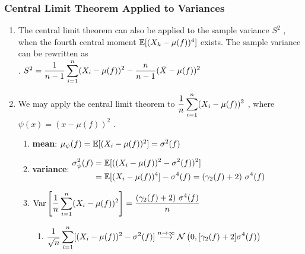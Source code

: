 \subsubsection{Central Limit Theorem Applied to Variances}

\begin{enumerate}
    \item The central limit theorem can also be applied to the sample variance $S^2$ , when the fourth central moment $\mathbb{E}[(X _k - \mu( f ))^4]$ exists.
    The sample variance can be rewritten as
    \hfill \cite{statistics/book/Statistics-for-Data-Scientists/Maurits-Kaptein}
    \\
    .\hfill
    $
        S^2 = \dfrac{1}{n - 1} \displaystyle\sum^n _{i=1} (X _i - \mu( f ))^2 - \dfrac{n}{n - 1} (\bar{X} - \mu( f ))^2
    $
    \hfill \cite{statistics/book/Statistics-for-Data-Scientists/Maurits-Kaptein}

    \item We may apply the central limit theorem to $\dfrac{1}{ n} \displaystyle\sum ^n _{i=1} (X_ i - \mu  ( f ))^2$ , where $\psi(x) = (x - \mu ( f ))^2$ .
    \hfill \cite{statistics/book/Statistics-for-Data-Scientists/Maurits-Kaptein}
    \begin{enumerate}
        \item \textbf{mean}: $\mu _\psi ( f ) = \mathbb{E}[(X _i - \mu ( f ))^2] = \sigma ^2( f )$
        \hfill \cite{statistics/book/Statistics-for-Data-Scientists/Maurits-Kaptein}

        \item \textbf{variance}:
        $
            \begin{aligned}
                \sigma  ^2 _\psi ( f )
                &= \mathbb{E}[((X _i - \mu ( f ))^2 - \sigma ^ 2( f ))^2 ] \\
                &= \mathbb{E}[(X _i - \mu ( f ))^4] - \sigma ^ 4( f )
                = (\gamma_2( f ) + 2)\ \sigma  ^4( f )
            \end{aligned}
        $
        \hfill \cite{statistics/book/Statistics-for-Data-Scientists/Maurits-Kaptein}

        \item
        $
            \text{Var}\left[\dfrac{1}{n} \displaystyle\sum^n _{i=1}(X _i - \mu ( f ))^2\right]
            = \dfrac{(\gamma_2( f ) + 2)\ \sigma^ 4( f )}{n}
        $
        \hfill \cite{statistics/book/Statistics-for-Data-Scientists/Maurits-Kaptein}
        \begin{enumerate}
            \item
            $
                \dfrac{1}{\sqrt{n}} \displaystyle\sum^n _{i=1} [(X _i - \mu ( f ))^2 - \sigma ^2( f )]
                \overset{n \to \infty}{\longrightarrow}
                \mathcal{N}\left(0,  [\gamma_2( f ) + 2]\sigma ^4( f )\right)
            $
            \hfill \cite{statistics/book/Statistics-for-Data-Scientists/Maurits-Kaptein}


\end{enumerate}
\end{enumerate}
\end{enumerate}
